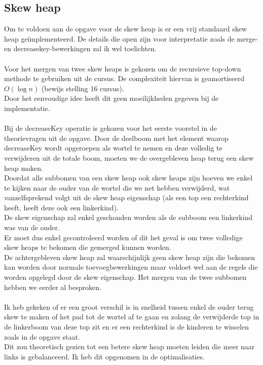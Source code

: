\documentclass[10pt,a4paper,twoside]{article}
\begin{document}
\subsection{Skew heap}
Om te voldoen aan de opgave voor de skew heap is er een vrij standaard skew heap geïmplementeerd.
De details die open zijn voor interpretatie zoals de merge- en decreasekey-bewerkingen zal ik wel toelichten.
\\\\
Voor het mergen van twee skew heaps is gekozen om de recursieve top-down methode te gebruiken uit de cursus.
De complexiteit hiervan is geamortiseerd $O(\log{}n)$ (bewijs stelling 16 cursus). \\Door het eenvoudige idee heeft dit geen moeilijkheden gegeven bij de implementatie.
\\\\
Bij de {\selectfont decreaseKey} operatie is gekozen voor het eerste voorstel in de theorievragen uit de opgave.
Door de deelboom met het element waarop {\selectfont decreaseKey} wordt opgeroepen als wortel te nemen en deze volledig te verwijderen uit de totale boom, moeten we de overgebleven heap terug een skew heap maken.\\
Doordat alle subbomen van een skew heap ook skew heaps zijn hoeven we enkel te kijken naar de ouder van de wortel die we net hebben verwijderd, wat vanzelfsprekend volgt uit de skew heap eigenschap (als een top een rechterkind heeft, heeft deze ook een linkerkind).\\ 
De skew eigenschap zal enkel geschonden worden als de subboom een linkerkind was van de ouder.\\
Er moet dus enkel gecontroleerd worden of dit het geval is om twee volledige skew heaps te bekomen die gemerged kunnen worden.\\
De achtergebleven skew heap zal waarschijnlijk geen skew heap zijn die bekomen kan worden door normale toevoegbewerkingen maar voldoet wel aan de regels die worden opgelegd door de skew eigenschap. Het mergen van de twee subbomen hebben we eerder al besproken.
\\\\
Ik heb gekeken of er een groot verschil is in snelheid tussen enkel de ouder terug skew te maken of het pad tot de wortel af te gaan en zolang de verwijderde top in de linkerboom van deze top zit en er een rechterkind is de kinderen te wisselen zoals in de opgave staat.\\
Dit zou theoretisch gezien tot een betere skew heap moeten leiden die meer naar links is gebalanceerd. Ik heb dit opgenomen in de optimalisaties.
\end{document}
